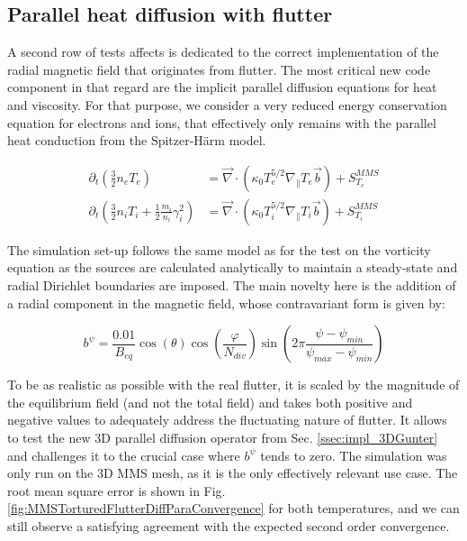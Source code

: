 \subsection{Parallel heat diffusion with flutter}

A second row of tests affects is dedicated to the correct implementation of the radial magnetic field that originates from flutter. The most critical new code component in that regard are the implicit parallel diffusion equations for heat and viscosity. For that purpose, we consider a very reduced energy conservation equation for electrons and ions, that effectively only remains with the parallel heat conduction from the Spitzer-Härm model. 

\begin{align}
	\partial_t \left( \frac{3}{2} n_e T_e                                          \right) &= \vec{\nabla}\cdot\left(\kappa_0 T_e^{5/2} \nabla_\parallel T_e \vec{b}\right) + S_{T_e}^{MMS} \\
	\partial_t \left( \frac{3}{2} n_i T_i + \frac{1}{2} \frac{m_i}{n_i} \gamma_i^2 \right) &= \vec{\nabla}\cdot\left(\kappa_0 T_i^{5/2} \nabla_\parallel T_i \vec{b}\right) + S_{T_i}^{MMS} 
\end{align}

The simulation set-up follows the same model as for the test on the vorticity equation as the sources are calculated analytically to maintain a steady-state and radial Dirichlet boundaries are imposed. The main novelty here is the addition of a radial component in the magnetic field, whose contravariant form is given by:

\begin{equation}
	b^\psi =\frac{ 0.01}{B_{eq}} \cos(\theta)\cos(\frac{\varphi}{N_{div}})\sin(2\pi \frac{\psi-\psi_{min}}{\psi_{max} - \psi_{min}})
\end{equation}

To be as realistic as possible with the real flutter, it is scaled by the magnitude of the equilibrium field (and not the total field) and takes both positive and negative values to adequately address the fluctuating nature of flutter. It allows to test the new 3D parallel diffusion operator from Sec. \ref{ssec:impl_3DGunter} and challenges it to the crucial case where $b^\psi$ tends to zero. The simulation was only run on the 3D MMS mesh, as it is the only effectively relevant use case. The root mean square error is shown in Fig. \ref{fig:MMSTorturedFlutterDiffParaConvergence} for both temperatures, and we can still observe a satisfying agreement with the expected second order convergence.

